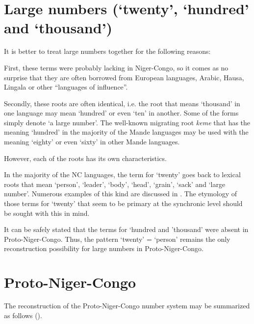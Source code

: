 \section{Large numbers (‘twenty’, ‘hundred’ and ‘thousand’)}%

It is better to treat large numbers together for the following reasons:

First, these terms were probably lacking in Niger-Congo, so it comes as no surprise that they are often borrowed from European languages, Arabic, Hausa, Lingala or other “languages of influence”.    

Secondly, these roots are often identical, i.e. the root that means ‘thousand’ in one language may mean ‘hundred’ or even ‘ten’ in another. Some of the forms simply denote ‘a large number’. The well-known migrating root \textit{keme} that has the meaning ‘hundred’ in the majority of the Mande languages may be used with the meaning ‘eighty’ or even ‘sixty’ in other Mande languages.

However, each of the roots has its own characteristics.

In the majority of the NC languages, the term for ‘twenty’ goes back to lexical roots that mean ‘person’, ‘leader’, ‘body’, ‘head’, ‘grain’, ‘sack’ and ‘large number’. Numerous examples of this kind are discussed in . The etymology of those terms for ‘twenty’ that seem to be primary at the synchronic level should be sought with this in mind.

It can be safely stated that the terms for ‘hundred and ’thousand’ were absent in Proto-Niger-Congo. Thus, the pattern ‘twenty’ = ‘person’ remains the only reconstruction possibility for large numbers in Proto-Niger-Congo.


\section{Proto-Niger-Congo}%

The reconstruction of the Proto-Niger-Congo number system may be summarized as follows ().

